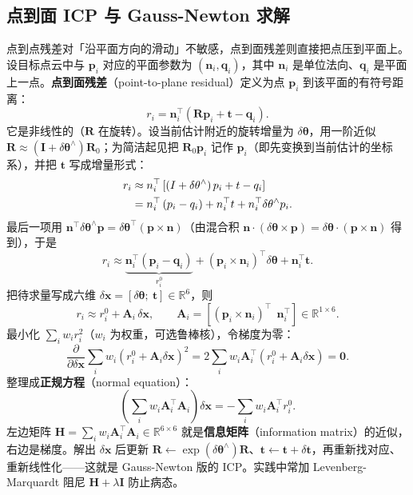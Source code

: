 \subsection{点到面 ICP 与 Gauss-Newton 求解}

点到点残差对「沿平面方向的滑动」不敏感，点到面残差则直接把点压到平面上。设目标点云中与 $\bm{p}_i$ 对应的平面参数为 $(\bm{n}_i,\bm{q}_i)$，其中 $\bm{n}_i$ 是单位法向、$\bm{q}_i$ 是平面上一点。\textbf{点到面残差}（point-to-plane residual）定义为点 $\bm{p}_i$ 到该平面的有符号距离：
\begin{equation}
  r_i = \bm{n}_i^{\top}\left(\bm{R}\bm{p}_i+\bm{t}-\bm{q}_i\right).
  \label{eq:07-p2plane}
\end{equation}
它是非线性的（$\bm{R}$ 在旋转）。设当前估计附近的旋转增量为 $\delta\bm{\theta}$，用一阶近似 $\bm{R}\approx(\bm{I}+\delta\bm{\theta}^{\wedge})\bm{R}_0$；为简洁起见把 $\bm{R}_0\bm{p}_i$ 记作 $\bm{p}_i$（即先变换到当前估计的坐标系），并把 $\bm{t}$ 写成增量形式：
\begin{align}
  r_i &\approx n_i^{\top}\left[\left(I+\delta\theta^{\wedge}\right)p_i+t-q_i\right] \notag\\
  &= n_i^{\top}\left(p_i-q_i\right)+n_i^{\top}t
     +n_i^{\top}\delta\theta^{\wedge}p_i.
\end{align}
最后一项用 $\bm{n}^{\top}\delta\bm{\theta}^{\wedge}\bm{p}=\delta\bm{\theta}^{\top}\left(\bm{p}\times\bm{n}\right)$（由混合积 $\bm{n}\cdot(\delta\bm{\theta}\times\bm{p})=\delta\bm{\theta}\cdot(\bm{p}\times\bm{n})$ 得到），于是
\begin{equation}
  r_i \approx \underbrace{\bm{n}_i^{\top}\left(\bm{p}_i-\bm{q}_i\right)}_{r_i^{0}}
  + \left(\bm{p}_i\times\bm{n}_i\right)^{\top}\delta\bm{\theta}+\bm{n}_i^{\top}\bm{t}.
\end{equation}
把待求量写成六维 $\delta\bm{x}=[\delta\bm{\theta};\ \bm{t}]\in\mathbb{R}^{6}$，则
\begin{equation}
  r_i \approx r_i^{0} + \bm{A}_i\,\delta\bm{x},
  \qquad
  \bm{A}_i = \left[\left(\bm{p}_i\times\bm{n}_i\right)^{\top}\ \ \bm{n}_i^{\top}\right]\in\mathbb{R}^{1\times6}.
  \label{eq:07-p2plane-jac}
\end{equation}
最小化 $\sum_i w_i r_i^{2}$（$w_i$ 为权重，可选鲁棒核），令梯度为零：
\begin{equation}
  \frac{\partial}{\partial\delta\bm{x}}\sum_i w_i\left(r_i^{0}+\bm{A}_i\delta\bm{x}\right)^{2}
  = 2\sum_i w_i\bm{A}_i^{\top}\left(r_i^{0}+\bm{A}_i\delta\bm{x}\right)=\bm{0}.
\end{equation}
整理成\textbf{正规方程}（normal equation）：
\begin{equation}
  \left(\sum_i w_i\bm{A}_i^{\top}\bm{A}_i\right)\delta\bm{x}
  = -\sum_i w_i\bm{A}_i^{\top}r_i^{0}.
  \label{eq:07-gn}
\end{equation}
左边矩阵 $\bm{H}=\sum_i w_i\bm{A}_i^{\top}\bm{A}_i\in\mathbb{R}^{6\times6}$ 就是\textbf{信息矩阵}（information matrix）的近似，右边是梯度。解出 $\delta\bm{x}$ 后更新 $\bm{R}\leftarrow\exp(\delta\bm{\theta}^{\wedge})\bm{R}$、$\bm{t}\leftarrow\bm{t}+\delta\bm{t}$，再重新找对应、重新线性化——这就是 Gauss-Newton 版的 ICP。实践中常加 Levenberg-Marquardt 阻尼 $\bm{H}+\lambda\bm{I}$ 防止病态。

